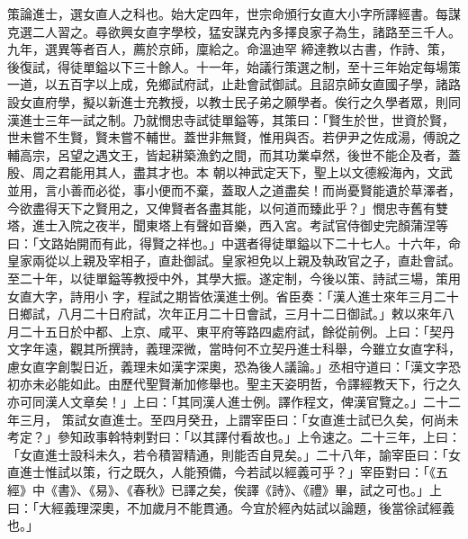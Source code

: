 \begin{pinyinscope}
 策論進士，選女直人之科也。始大定四年，世宗命頒行女直大小字所譯經書。每謀克選二人習之。尋欲興女直字學校，猛安謀克內多擇良家子為生，諸路至三千人。九年，選異等者百人，薦於京師，廩給之。命溫迪罕
 締達教以古書，作詩、策，後復試，得徒單鎰以下三十餘人。十一年，始議行策選之制，至十三年始定每場策一道，以五百字以上成，免鄉試府試，止赴會試御試。且詔京師女直國子學，諸路設女直府學，擬以新進士充教授，以教士民子弟之願學者。俟行之久學者眾，則同漢進士三年一試之制。乃就憫忠寺試徒單鎰等，其策曰：「賢生於世，世資於賢，世未嘗不生賢，賢未嘗不輔世。蓋世非無賢，惟用與否。若伊尹之佐成湯，傅說之輔高宗，呂望之遇文王，皆起耕築漁釣之間，而其功業卓然，後世不能企及者，蓋殷、周之君能用其人，盡其才也。本
 朝以神武定天下，聖上以文德綏海內，文武並用，言小善而必從，事小便而不棄，蓋取人之道盡矣！而尚憂賢能遺於草澤者，今欲盡得天下之賢用之，又俾賢者各盡其能，以何道而臻此乎？」憫忠寺舊有雙塔，進士入院之夜半，聞東塔上有聲如音樂，西入宮。考試官侍御史完顏蒲涅等曰：「文路始開而有此，得賢之祥也。」中選者得徒單鎰以下二十七人。十六年，命皇家兩從以上親及宰相子，直赴御試。皇家袒免以上親及執政官之子，直赴會試。至二十年，以徒單鎰等教授中外，其學大振。遂定制，今後以策、詩試三場，策用女直大字，詩用小
 字，程試之期皆依漢進士例。省臣奏：「漢人進士來年三月二十日鄉試，八月二十日府試，次年正月二十日會試，三月十二日御試。」敕以來年八月二十五日於中都、上京、咸平、東平府等路四處府試，餘從前例。上曰：「契丹文字年遠，觀其所撰詩，義理深微，當時何不立契丹進士科舉，今雖立女直字科，慮女直字創製日近，義理未如漢字深奧，恐為後人議論。」丞相守道曰：「漢文字恐初亦未必能如此。由歷代聖賢漸加修舉也。聖主天姿明哲，令譯經教天下，行之久亦可同漢人文章矣！」上曰：「其同漢人進士例。譯作程文，俾漢官覽之。」二十二年三月，
 策試女直進士。至四月癸丑，上謂宰臣曰：「女直進士試已久矣，何尚未考定？」參知政事斡特剌對曰：「以其譯付看故也。」上令速之。二十三年，上曰：「女直進士設科未久，若令積習精通，則能否自見矣。」二十八年，諭宰臣曰：「女直進士惟試以策，行之既久，人能預備，今若試以經義可乎？」宰臣對曰：「《五經》中《書》、《易》、《春秋》已譯之矣，俟譯《詩》、《禮》畢，試之可也。」上曰：「大經義理深奧，不加歲月不能貫通。今宜於經內姑試以論題，後當徐試經義也。」




\end{pinyinscope}
